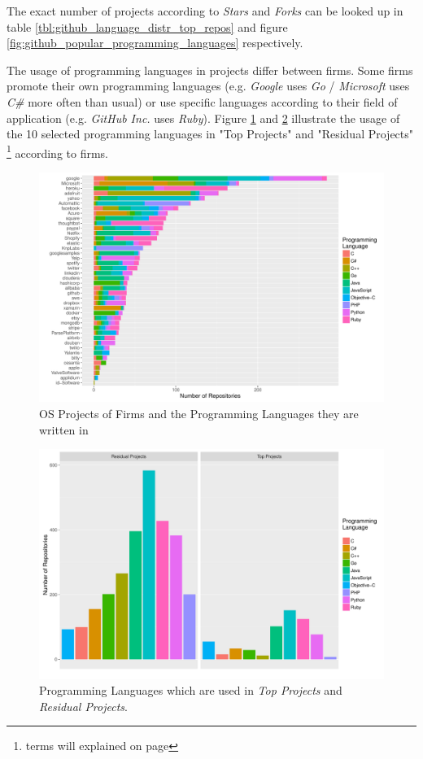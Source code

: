 The exact number of projects according to \textit{Stars} and \textit{Forks} can be looked up in table \ref{tbl:github_language_distr_top_repos} and figure \ref{fig:github_popular_programming_languages} respectively.

The usage of programming languages in projects differ between firms. Some firms promote their own programming languages (e.g. \textit{Google} uses \textit{Go} / \textit{Microsoft} uses \textit{C\#} more often than usual) or use specific languages according to their field of application (e.g. \textit{GitHub Inc.} uses \textit{Ruby}). Figure \ref{fig:programming_language_use_by_firms} and
\ref{fig:languages_used_in_projects} illustrate the usage of the 10 selected programming languages in "Top Projects" and "Residual Projects" \footnote{terms will explained on page \pageref{sec:top_and_residual_projects}} according to firms.

\begin{figure}[!h]
	\centering
	\includegraphics[page=1,scale=0.45]{../graphics/intro/programming_language_use_by_firms.pdf}
	\caption{OS Projects of Firms and the Programming Languages they are written in}
	\label{fig:programming_language_use_by_firms}
\end{figure}

\begin{figure}[!h]
	\centering
	\includegraphics[page=1,scale=0.45]{../graphics/intro/languages_used_in_projects.pdf}
	\caption{Programming Languages which are used in \textit{Top Projects} and \textit{Residual Projects}.}
	\label{fig:languages_used_in_projects}
\end{figure}

